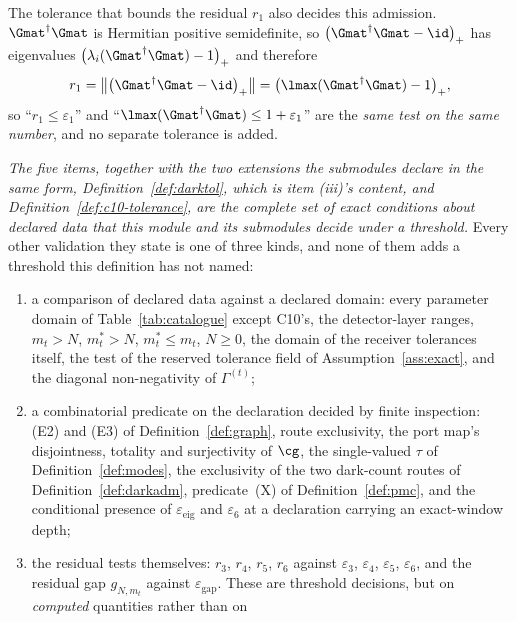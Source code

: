\begin{definition}
\begin{enumerate}[label=(\roman*),leftmargin=3.0em]
  The tolerance that bounds the residual $r_1$ also decides this admission.
  $\Gmat^\dagger\Gmat$ is Hermitian positive semidefinite, so
  $\big(\Gmat^\dagger\Gmat-\id\big)_+$ has eigenvalues
  $\big(\lambda_i(\Gmat^\dagger\Gmat)-1\big)_+$ and therefore
  \begin{equation}\label{eq:r1islmax}
    r_1=\big\lVert\big(\Gmat^\dagger\Gmat-\id\big)_{+}\big\rVert
      =\big(\lmax(\Gmat^\dagger\Gmat)-1\big)_{+} ,
  \end{equation}
  so ``$r_1\le\varepsilon_1$'' and ``$\lmax(\Gmat^\dagger\Gmat)\le
  1+\varepsilon_1$'' are the \emph{same test on the same number}, and no
  separate tolerance is added.
\end{enumerate}
\emph{The five items, together with the two extensions the submodules declare
in the same form, Definition~\ref{def:darktol}, which is item (iii)'s content,
and Definition~\ref{def:c10-tolerance}, are the complete set of exact conditions
about \emph{declared} data that this module and its submodules decide under a
threshold.} Every other validation they state is one of three kinds, and none
of them adds a threshold this definition has not named:
\begin{enumerate}[label=(\alph*),leftmargin=2.2em]
\item a comparison of declared data against a declared domain: every parameter
  domain of Table~\ref{tab:catalogue} except C10's, the detector-layer ranges,
  $m_t>N$, $m^{\ast}_t>N$, $m^{\ast}_t\le m_t$, $N\ge0$, the domain of the
  receiver tolerances itself, the test of
  the reserved tolerance field of Assumption~\ref{ass:exact}, and the diagonal
  non-negativity of $\Gamma^{(t)}$;
\item a combinatorial predicate on the declaration decided by finite
  inspection: (E2) and (E3) of Definition~\ref{def:graph}, route exclusivity,
  the port map's disjointness, totality and surjectivity of $\cg$, the
  single-valued $\tau$ of Definition~\ref{def:modes}, the exclusivity of the
  two dark-count routes of Definition~\ref{def:darkadm}, predicate~(X) of
  Definition~\ref{def:pmc}, and the conditional presence of
  $\varepsilon_{\mathrm{eig}}$ and $\varepsilon_6$ at a declaration carrying an
  exact-window depth;
\item the residual tests themselves: $r_3$, $r_4$, $r_5$, $r_6$ against
  $\varepsilon_3$, $\varepsilon_4$, $\varepsilon_5$, $\varepsilon_6$, and the
  residual gap $g_{N,m_t}$ against $\varepsilon_{\mathrm{gap}}$. These are
  threshold decisions, but on \emph{computed} quantities rather than on

\end{enumerate}
\end{definition}
